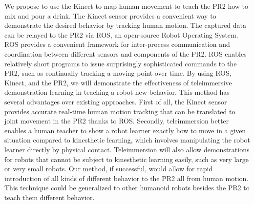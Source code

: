 \documentclass{sig-alternate}
\begin{document}
We propose to use the Kinect to map human movement to teach the PR2 how to mix and pour a drink. The Kinect sensor provides a convenient way to demonstrate the desired behavior by tracking human motion. The captured data can be relayed to the PR2 via ROS, an open-source Robot Operating System\cite{ros}. ROS provides a convenient framework for inter-process communication and coordination between different sensors and components of the PR2. ROS enables relatively short programs to issue surprisingly sophisticated commands to the PR2, such as continually tracking a moving point over time\cite{ros_pr2}. By using ROS, Kinect, and the PR2, we will demonstrate the effectiveness of teleimmersive demonstration learning in teaching a robot new behavior. This method has several advantages over existing approaches. First of all, the Kinect sensor provides accurate real-time human motion tracking that can be translated to joint movement in the PR2 thanks to ROS. Secondly, teleimmersion better enables a human teacher to show a robot learner exactly how to move in a given situation compared to kinesthetic learning, which involves manipulating the robot learner directly by physical contact. Teleimmersion will also allow demonstrations for robots that cannot be subject to kinesthetic learning easily, such as very large or very small robots. Our method, if successful, would allow for rapid introduction of all kinds of different behavior to the PR2 all from human motion. This technique could be generalized to other humanoid robots besides the PR2 to teach them different behavior.
	
\end{document}
